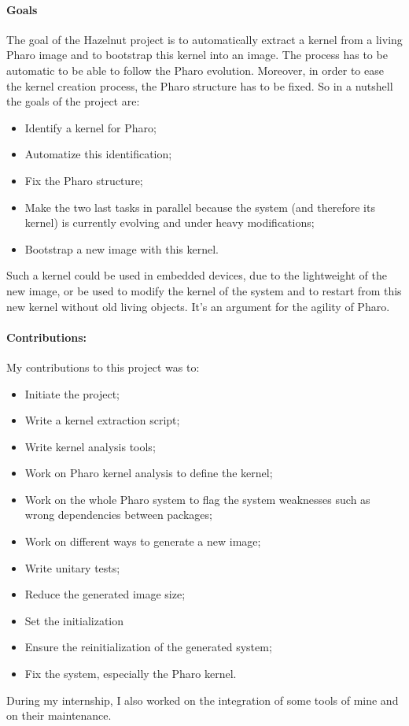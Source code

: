 \paragraph{Goals}
The goal of the Hazelnut project is to automatically extract a kernel from a living \gls{Pharo} image and to bootstrap this kernel into an image. The process has to be automatic to be able to follow the \gls{Pharo} evolution. Moreover, in order to ease the kernel creation process, the \gls{Pharo} structure has to be fixed. So in a nutshell the goals of the project are:
	\begin{itemize}
		\item Identify a kernel for \gls{Pharo};
		\item Automatize this identification;
		\item Fix the \gls{Pharo} structure;
		\item Make the two last tasks in parallel because the system (and therefore its kernel) is currently evolving and under heavy modifications;
		\item Bootstrap a new image with this kernel.
	\end{itemize}
Such a kernel could be used in embedded devices, due to the lightweight of the new image, or be used to modify the kernel of the system and to restart from this new kernel without old living objects. It's an argument for the agility of \gls{Pharo}.

\paragraph{Contributions:}
My contributions to this project was to:
	\begin{itemize}
		\item Initiate the project;
		\item Write a kernel extraction script;
		\item Write kernel analysis tools;
		\item Work on \gls{Pharo} kernel analysis to define the kernel;
		\item Work on the whole \gls{Pharo} system to flag the system weaknesses such as wrong dependencies between packages;
		\item Work on different ways to generate a new image;
		\item Write unitary tests;
		\item Reduce the generated image size;
		\item Set the initialization
		\item Ensure the reinitialization of the generated system;
		\item Fix the system, especially the \gls{Pharo} kernel.
	\end{itemize}
During my internship, I also worked on the integration of some tools of mine and on their maintenance.